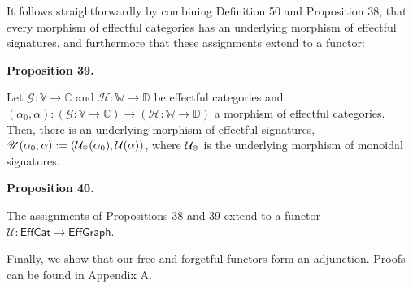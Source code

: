  
 
It follows straightforwardly by combining Definition 50 and Proposition 38, that every morphism of effectful categories has an underlying morphism of effectful signatures, and furthermore that these assignments extend to a functor:\par
 
 
 
\par\medskip\noindent\textbf{Proposition 39.}\par
 
 
Let $\mathscr{G}:\mathbb{V}\to\mathbb{C}$ and $\mathscr{H}:\mathbb{W}\to\mathbb{D}$ be effectful categories and $(\alpha_{0},\alpha):(\mathscr{G}:\mathbb{V}\to\mathbb{C})\to(\mathscr{H}:\mathbb{W}\to\mathbb{D})$ a morphism of effectful categories. Then, there is an underlying morphism of effectful signatures, $\mathscr{U}(\alpha_{0},\alpha):=(\mathcal{U}_{\mathbin{\raisebox{1.25pt}{$\scriptscriptstyle\otimes$}}}(\alpha_{0}),\mathcal{U}(\alpha))$, where $\mathcal{U}_{\mathbin{\raisebox{1.25pt}{$\scriptscriptstyle\otimes$}}}$ is the underlying morphism of monoidal signatures.\par
 
 
 
 
\par\medskip\noindent\textbf{Proposition 40.}\par
 
 
The assignments of Propositions 38 and 39 extend to a functor $\mathscr{U}:\mathsf{EffCat}\to\mathsf{EffGraph}.$\par
 
 
 
 
Finally, we show that our free and forgetful functors form an adjunction. Proofs can be found in Appendix A.\par
 
 
 
